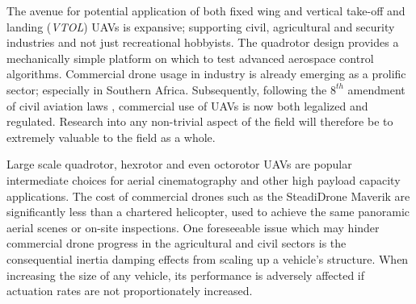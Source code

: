 \par
The avenue for potential application of both fixed wing and vertical take-off and landing (\emph{VTOL}) UAVs is expansive; supporting civil\cite{civilquadcopter}, agricultural\cite{agriculturequadcopter} and security\cite{videosurveillancequadcopter} industries and not just recreational hobbyists. The quadrotor design provides a mechanically simple platform on which to test advanced aerospace control algorithms. Commercial drone usage in industry is already emerging as a prolific sector; especially in Southern Africa. Subsequently, following the $8^{th}$ amendment of civil aviation laws \cite{dronelaw}, commercial use of UAVs is now both legalized and regulated. Research into any non-trivial aspect of the field will therefore be to extremely valuable to the field as a whole. 
\par
Large scale quadrotor, hexrotor and even octorotor UAVs are popular intermediate choices for aerial cinematography and other high payload capacity applications. The cost of commercial drones such as the SteadiDrone Maverik \cite{steadidrone} are significantly less than a chartered helicopter, used to achieve the same panoramic aerial scenes or on-site inspections. One foreseeable issue which may hinder commercial drone progress in the agricultural and civil sectors is the consequential inertia damping effects from scaling up a vehicle's structure. When increasing the size of any vehicle, its performance is adversely affected if actuation rates are not proportionately increased.
